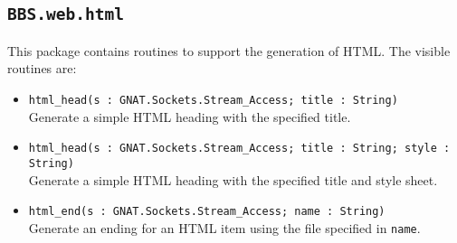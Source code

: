 \documentclass[10pt, openany]{book}
\newcommand{\package}[1]{\texttt{#1}}
\newcommand{\function}[1]{\texttt{#1}}
\newcommand{\keyword}[1]{\texttt{#1}}
\begin{document}
\subsection{\package{BBS.web.html}}
This package contains routines to support the generation of HTML.  The visible routines are:
\begin{itemize}
  \item \function{html\_head(s : GNAT.Sockets.Stream\_Access; title : String)}\\
  Generate a simple HTML heading with the specified title.
  \item \function{html\_head(s : GNAT.Sockets.Stream\_Access; title : String; style : String)}\\
  Generate a simple HTML heading with the specified title and style sheet.
  \item \function{html\_end(s : GNAT.Sockets.Stream\_Access; name : String)}\\
  Generate an ending for an HTML item using the file specified in \keyword{name}.
\end{itemize}
\end{document}
